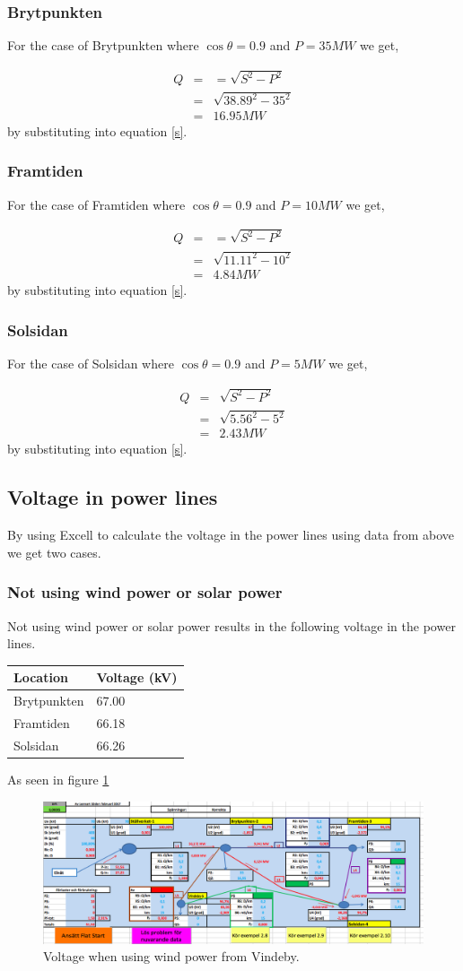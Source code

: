 \documentclass{report}
\newcommand{\case}[1]{\subsubsection*{#1}}
\newcommand{\mysubpart}[1]{\subsection*{#1}}
\begin{document}
\case{Brytpunkten}
For the case of Brytpunkten where $\cos\theta = 0.9$ and $P = 35 MW$ we get,
 
\begin{eqnarray}
Q&=&   = \sqrt{S^2 - P^2}\\
&=& \sqrt{38.89^2 - 35^2} \\
&=& 16.95 MW \label{res}
\end{eqnarray} 
by substituting into equation \ref{s}.

\case{Framtiden}
For the case of Framtiden where $\cos\theta = 0.9$ and $P = 10 MW$ we get,
 
\begin{eqnarray}
Q&=&   = \sqrt{S^2 - P^2}\\
&=& \sqrt{11.11^2 - 10^2} \\
&=& 4.84 MW \label{res}
\end{eqnarray} 
by substituting into equation \ref{s}.

\case{Solsidan}
For the case of Solsidan where $\cos\theta = 0.9$ and $P = 5 MW$ we get,
 
\begin{eqnarray}
Q&=&  \sqrt{S^2 - P^2}\\
&=& \sqrt{5.56^2 - 5^2} \\
&=& 2.43 MW \label{res}
\end{eqnarray} by substituting into equation \ref{s}.

\mysubpart{Voltage in power lines}\label{Voltage1}
By using Excell to calculate the voltage in the power lines using data from above we get two cases.

\case{Not using wind power or solar power}
Not using wind power or solar power results in the following voltage in the power lines. 

\begin{table}[H] 
\begin{tabular}{ll}
\toprule
Location & Voltage (kV) \\
\midrule
Brytpunkten & 67.00\\
Framtiden  &  66.18\\
Solsidan & 66.26\\
\bottomrule
\end{tabular} 
\end{table} 

As seen in figure \ref{fig_utan_vindeby}
\begin{figure}[h]
\label{fig_utan_vindeby}
\includegraphics[width=\linewidth]{utan_vindeby.png}
\caption{Voltage when using wind power from Vindeby.} 
\end{figure}
\end{document}

